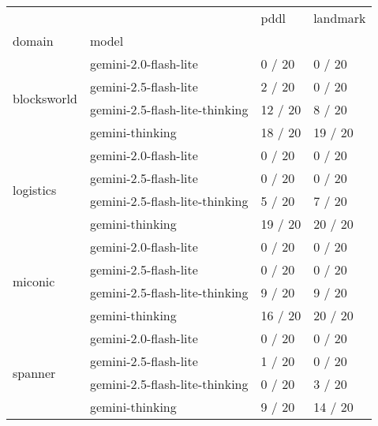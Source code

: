 \begin{tabular}{llll}
\toprule
 &  & pddl & landmark \\
domain & model &  &  \\
\midrule
\multirow[t]{4}{*}{blocksworld} & gemini-2.0-flash-lite & 0 / 20 & 0 / 20 \\
 & gemini-2.5-flash-lite & 2 / 20 & 0 / 20 \\
 & gemini-2.5-flash-lite-thinking & 12 / 20 & 8 / 20 \\
 & gemini-thinking & 18 / 20 & 19 / 20 \\
\cline{1-4}
\multirow[t]{4}{*}{logistics} & gemini-2.0-flash-lite & 0 / 20 & 0 / 20 \\
 & gemini-2.5-flash-lite & 0 / 20 & 0 / 20 \\
 & gemini-2.5-flash-lite-thinking & 5 / 20 & 7 / 20 \\
 & gemini-thinking & 19 / 20 & 20 / 20 \\
\cline{1-4}
\multirow[t]{4}{*}{miconic} & gemini-2.0-flash-lite & 0 / 20 & 0 / 20 \\
 & gemini-2.5-flash-lite & 0 / 20 & 0 / 20 \\
 & gemini-2.5-flash-lite-thinking & 9 / 20 & 9 / 20 \\
 & gemini-thinking & 16 / 20 & 20 / 20 \\
\cline{1-4}
\multirow[t]{4}{*}{spanner} & gemini-2.0-flash-lite & 0 / 20 & 0 / 20 \\
 & gemini-2.5-flash-lite & 1 / 20 & 0 / 20 \\
 & gemini-2.5-flash-lite-thinking & 0 / 20 & 3 / 20 \\
 & gemini-thinking & 9 / 20 & 14 / 20 \\
\cline{1-4}
\end{tabular}